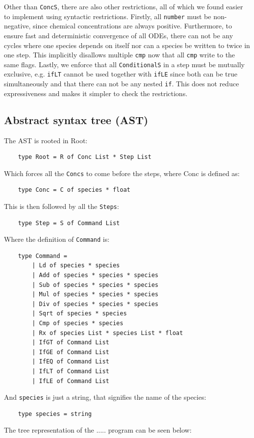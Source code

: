 Other than \texttt{ConcS}, there are also other restrictions, all of which we found easier to implement using syntactic restrictions. Firstly, all \texttt{number} must be non-negative, since chemical concentrations are always positive. Furthermore, to ensure fast and deterministic convergence of all ODEs, there can not be any cycles where one species depends on itself nor can a species be written to twice in one step. This implicitly disallows multiple \texttt{cmp} now that all \texttt{cmp} write to the same flags. Lastly, we enforce that all \texttt{ConditionalS} in a step must be mutually exclusive, e.g. \texttt{ifLT} cannot be used together with \texttt{ifLE} since both can be true simultaneously and that there can not be any nested \texttt{if}. This does not reduce expressiveness and makes it simpler to check the restrictions.



\subsection{Abstract syntax tree (AST)}
The AST is rooted in Root: 
\begin{verbatim}
    type Root = R of Conc List * Step List
\end{verbatim}
Which forces all the \texttt{Concs} to come before the steps, where Conc is defined as:
\begin{verbatim}
    type Conc = C of species * float
\end{verbatim}
This is then followed by all the \texttt{Steps}:
\begin{verbatim}
    type Step = S of Command List
\end{verbatim}
Where the definition of \texttt{Command} is:
\begin{verbatim}
    type Command =
        | Ld of species * species
        | Add of species * species * species
        | Sub of species * species * species
        | Mul of species * species * species
        | Div of species * species * species
        | Sqrt of species * species
        | Cmp of species * species
        | Rx of species List * species List * float
        | IfGT of Command List
        | IfGE of Command List
        | IfEQ of Command List
        | IfLT of Command List
        | IfLE of Command List
\end{verbatim}
And \texttt{species} is just a string, that signifies the name of the species:
\begin{verbatim}
    type species = string
\end{verbatim}
The tree representation of the ..... program can be seen below:

